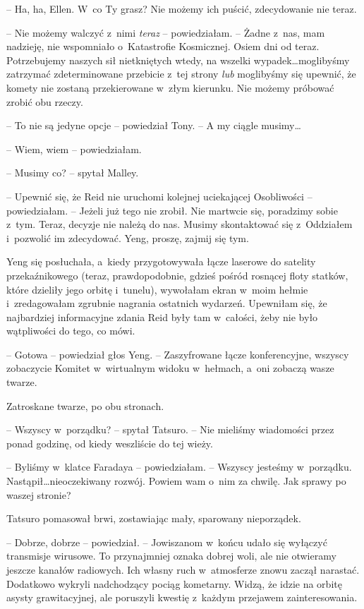 \documentclass[oneside,polish,11pt,sfheadings]{mwbk}
\begin{document}
-- Ha, ha, Ellen. W~co Ty grasz? Nie możemy ich puścić, zdecydowanie nie
teraz.

-- Nie możemy walczyć z~nimi \textit{teraz} -- powiedziałam. -- Żadne z~nas,
mam nadzieję, nie wspomniało o~Katastrofie Kosmicznej. Osiem dni od
teraz. Potrzebujemy naszych sił nietkniętych wtedy, na wszelki
wypadek\ldots  moglibyśmy zatrzymać zdeterminowane przebicie z~tej strony
\textit{lub} moglibyśmy się upewnić, że komety nie zostaną przekierowane w~złym kierunku. Nie możemy próbować zrobić obu rzeczy.

-- To nie są jedyne opcje -- powiedział Tony. -- A my ciągle musimy\ldots 

-- Wiem, wiem -- powiedziałam.

-- Musimy co? -- spytał Malley.

-- Upewnić się, że Reid nie uruchomi kolejnej uciekającej Osobliwości -- powiedziałam. -- Jeżeli już tego nie zrobił. Nie martwcie się, poradzimy
sobie z~tym. Teraz, decyzje nie należą do nas. Musimy skontaktować się z~Oddziałem i~pozwolić im zdecydować. Yeng, proszę, zajmij się tym.

Yeng się posłuchała, a~kiedy przygotowywała łącze laserowe do satelity
przekaźnikowego (teraz, prawdopodobnie, gdzieś pośród rosnącej floty
statków, które dzieliły jego orbitę i~tunelu), wywołałam ekran w~moim
hełmie i~zredagowałam zgrubnie nagrania ostatnich wydarzeń. Upewniłam
się, że najbardziej informacyjne zdania Reid były tam w~całości, żeby
nie było wątpliwości do tego, co mówi.

-- Gotowa -- powiedział głos Yeng. -- Zaszyfrowane łącze konferencyjne,
wszyscy zobaczycie Komitet w~wirtualnym widoku w~hełmach, a~oni zobaczą
wasze twarze.

Zatroskane twarze, po obu stronach.

-- Wszyscy w~porządku? -- spytał Tatsuro. -- Nie mieliśmy wiadomości przez
ponad godzinę, od kiedy weszliście do tej wieży.

-- Byliśmy w~klatce Faradaya -- powiedziałam. -- Wszyscy jesteśmy w~porządku. Nastąpił\ldots  nieoczekiwany rozwój. Powiem wam o~nim za chwilę.
Jak sprawy po waszej stronie?

Tatsuro pomasował brwi, zostawiając mały, sparowany nieporządek. 

-- Dobrze, dobrze -- powiedział. -- Jowiszanom w~końcu udało się wyłączyć
transmisje wirusowe. To przynajmniej oznaka dobrej woli, ale nie
otwieramy jeszcze kanałów radiowych. Ich własny ruch w~atmosferze znowu
zaczął narastać. Dodatkowo wykryli nadchodzący pociąg kometarny. Widzą,
że idzie na orbitę asysty grawitacyjnej, ale poruszyli kwestię z~każdym
przejawem zainteresowania.
\end{document}

